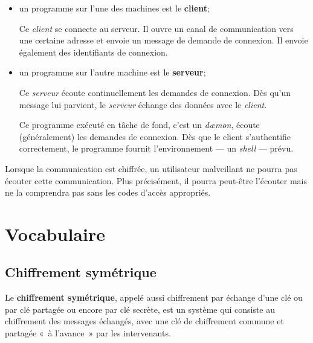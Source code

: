 \documentclass[a4paper,11pt]{article}
\begin{document}
\begin{itemize}

	\item un programme sur l'une des machines est le \textbf{client};

		Ce \emph{client} se connecte au serveur. Il ouvre un canal de
		communication vers une certaine adresse et envoie un message de demande
		de connexion. Il envoie également des identifiants de connexion.  

	\item un programme sur l'autre machine est le \textbf{serveur};

		Ce \emph{serveur} écoute continuellement les demandes de connexion.  Dès
		qu'un message lui parvient, le \emph{serveur} échange des données avec
		le \emph{client}.

		Ce programme exécuté en tâche de fond, c'est un \emph{dæmon}, écoute
		(généralement) les demandes de connexion. Dès que le client
		s'authentifie correctement, le programme fournit l'environnement --- un
		\emph{shell} --- prévu.

\end{itemize}

Lorsque la communication est chiffrée, un utilisateur malveillant ne pourra pas
écouter cette communication. Plus précisément, il pourra peut-être l'écouter
mais ne la comprendra pas sans les codes d'accès appropriés. 




\section{Vocabulaire}
\label{vocabulaire}

\secttoc

\subsection{Chiffrement symétrique}
\label{chiffrement-symétrique}

Le \textbf{chiffrement symétrique}, appelé aussi chiffrement par échange
d'une clé ou par clé partagée ou encore par clé secrète, est un système
qui consiste au chiffrement des messages échangés, avec une clé de
chiffrement commune et partagée «~à l'avance~» par les intervenants.
\end{document}
